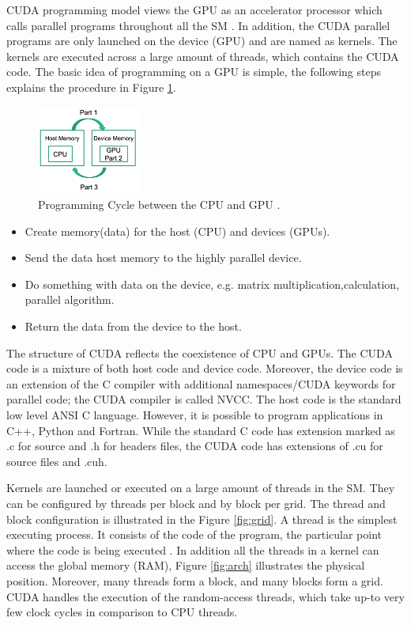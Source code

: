 CUDA programming model views the GPU as an accelerator processor which calls parallel programs throughout all the SM \cite{handbook}. In addition, the CUDA parallel programs are only launched on the device (GPU) and are named as kernels. The kernels are executed across a large amount of threads, which contains the CUDA code. The basic idea of programming on a GPU is simple, the following steps explains the procedure in Figure \ref{fig:cycle}.

\begin{figure}[htbp]
	\centering
		\includegraphics[width=0.3\textwidth]{Figures/cycle.png}
		\smallskip
	\caption[Programming CPU-GPU cycle]{Programming Cycle between the CPU and GPU \cite{example}.}
	\label{fig:cycle}
\end{figure}

\begin{itemize}
\item Create memory(data) for the host (CPU) and devices (GPUs).
\item Send the data host memory to the highly parallel device.
\item Do something with data on the device, e.g. matrix multiplication,calculation, parallel algorithm.
\item Return the data from the device to the host.
\end{itemize}

The structure of CUDA reflects the coexistence of CPU and GPUs. The CUDA code is a mixture of both host code and device code. Moreover, the device code is an extension of the C compiler with additional namespaces/CUDA keywords for parallel code; the CUDA compiler is called NVCC. The host code is the standard low level ANSI C language. However, it is possible to program applications in C++, Python and Fortran. While the standard C code has extension marked as .c for source and .h for headers files, the CUDA code has extensions of .cu for source files and .cuh.

Kernels are launched or executed on a large amount of threads in the SM. They can be configured by threads per block and by block per grid. The thread and block configuration is illustrated in the Figure \ref{fig:grid}. A thread is the simplest executing process. It consists of the code of the program, the particular point where the code is being executed \cite{hwu}. In addition all the threads in a kernel can access the global memory (RAM), Figure  \ref{fig:arch} illustrates the physical position. Moreover, many threads form a block, and many blocks form a grid. CUDA handles the execution of the random-access threads, which take up-to very few clock cycles in comparison to CPU threads.

